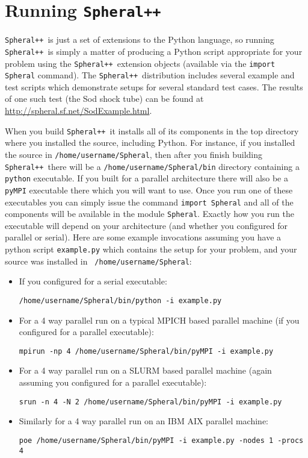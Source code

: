 \documentclass{article}
\newcommand{\Spheral}{{\tt Spheral++}}
\begin{document}
\section{Running \Spheral}
\Spheral\ is just a set of extensions to the Python language, so running
\Spheral\ is simply a matter of producing a Python script appropriate for your
problem using the \Spheral\ extension objects (available via the
\verb+import Spheral+ command).  The \Spheral\ distribution includes several
example and test scripts which demonstrate setups for several standard test
cases.  The results of one such test (the Sod shock tube) can be found
at \newline \url{http://spheral.sf.net/SodExample.html}.

When you build \Spheral\ it installs all of its components in the top
directory where you installed the source, including Python.  For instance, if
you installed the source in \verb+/home/username/Spheral+, then after you
finish building \Spheral\ there will be a \verb+/home/username/Spheral/bin+
directory containing a \verb+python+ executable.  If you built for a parallel
architecture there will also be a \verb+pyMPI+ executable there which you will
want to use.  Once you run one of these executables you can simply issue the
command \verb+import Spheral+ and all of the components will be available in the
module \verb+Spheral+.  Exactly how you run the executable will depend on your
architecture (and whether you configured for parallel or serial).  Here are some
example invocations assuming you have a python script \verb+example.py+ which
contains the setup for your problem, and your source was installed in {\tt
/home/username/Spheral}:
\begin{itemize}
\item If you configured for a serial executable:
\begin{verbatim}
/home/username/Spheral/bin/python -i example.py
\end{verbatim}
\item For a 4 way parallel run on a typical MPICH based parallel machine (if you
configured for a parallel executable):
\begin{verbatim}
mpirun -np 4 /home/username/Spheral/bin/pyMPI -i example.py
\end{verbatim}
\item For a 4 way parallel run on a SLURM based parallel machine (again assuming
you configured for a parallel executable):
\begin{verbatim}
srun -n 4 -N 2 /home/username/Spheral/bin/pyMPI -i example.py
\end{verbatim}
\item Similarly for a 4 way parallel run on an IBM AIX parallel machine:
\begin{verbatim}
poe /home/username/Spheral/bin/pyMPI -i example.py -nodes 1 -procs 4
\end{verbatim}
\end{itemize}
\end{document}
